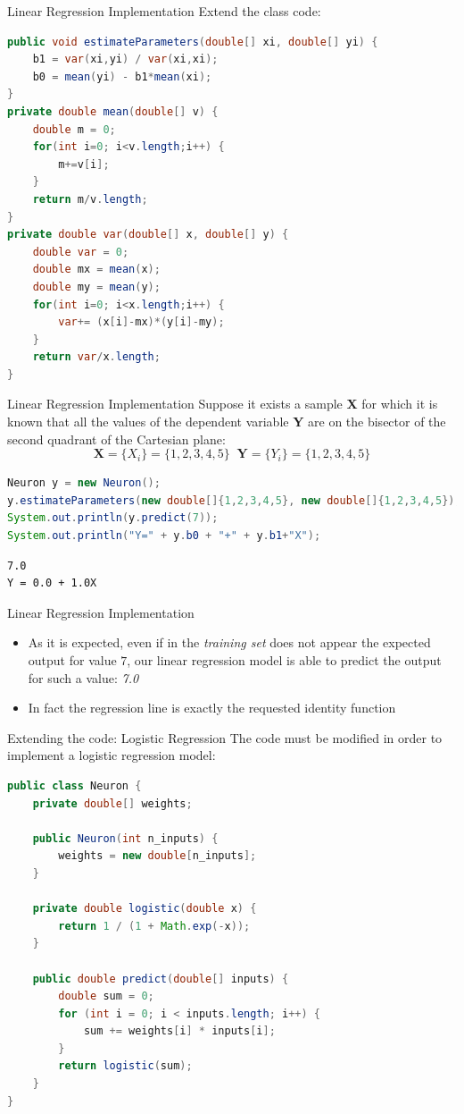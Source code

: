 \documentclass[xcolor ={table,usenames,dvipsnames}]{beamer}
\theoremstyle{definition}
\begin{document}
\begin{frame}[fragile]{Linear Regression Implementation}
	Extend the class code:
	\begin{lstlisting}[language = Java]
public void estimateParameters(double[] xi, double[] yi) {
	b1 = var(xi,yi) / var(xi,xi);
	b0 = mean(yi) - b1*mean(xi);
}
private double mean(double[] v) {
	double m = 0;
	for(int i=0; i<v.length;i++) {
		m+=v[i];
	}
	return m/v.length;
}
private double var(double[] x, double[] y) {
	double var = 0;
	double mx = mean(x);
	double my = mean(y);
	for(int i=0; i<x.length;i++) {
		var+= (x[i]-mx)*(y[i]-my);
	}
	return var/x.length;
}
\end{lstlisting}
\end{frame}
\begin{frame}[fragile]{Linear Regression Implementation}
Suppose it exists a sample \textbf{X} for which it is known that all the values of the dependent variable \textbf{Y} are on the bisector of the second quadrant of the Cartesian plane:
$$
\textbf{X} = \{X_i\} = \{1,2,3,4,5\}
\;\;
\textbf{Y} = \{Y_i\} = \{1,2,3,4,5\}
$$
\begin{lstlisting}[language = Java]
Neuron y = new Neuron();
y.estimateParameters(new double[]{1,2,3,4,5}, new double[]{1,2,3,4,5});
System.out.println(y.predict(7));
System.out.println("Y=" + y.b0 + "+" + y.b1+"X");
\end{lstlisting}
\begin{lstlisting}
7.0
Y = 0.0 + 1.0X
\end{lstlisting}
\end{frame}
\begin{frame}[fragile]{Linear Regression Implementation}
\begin{itemize}
\item As it is expected, even if in the \emph{training set} does not appear the expected output for value $7$, our linear regression model is able to predict the output for such a value: \textit{7.0}
\item In fact the regression line is exactly the requested identity function
\end{itemize}
\end{frame}
\begin{frame}[fragile]{Extending the code: Logistic Regression}
The code must be modified in order to implement a logistic regression model:
\begin{lstlisting}[language=Java]
public class Neuron {
	private double[] weights;

	public Neuron(int n_inputs) {
		weights = new double[n_inputs];
	}

	private double logistic(double x) {
		return 1 / (1 + Math.exp(-x));
	}

	public double predict(double[] inputs) {
		double sum = 0;
		for (int i = 0; i < inputs.length; i++) {
			sum += weights[i] * inputs[i];
		}
		return logistic(sum);
	}
}
\end{lstlisting}
\end{frame}
\end{document}

